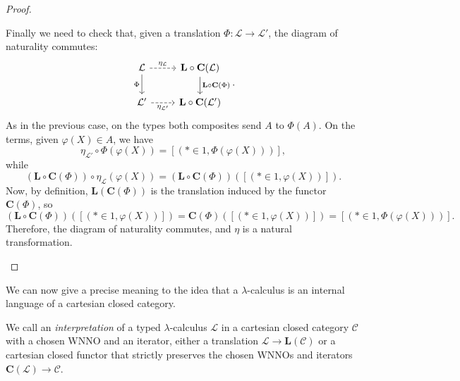 \begin{proof}
\begin{itemize}
        Finally we need to check that, given a translation $\Phi : \mathcal L \to \mathcal L'$, the diagram of naturality commutes:
        \[\begin{tikzcd}
            {\mathcal L} & {\mathbf L \circ \mathbf C(\mathcal L)} \\
            {\mathcal L'} & {\mathbf L \circ \mathbf C(\mathcal L')}
            \arrow["{\eta_{\mathcal L}}", dashed, from=1-1, to=1-2]
            \arrow["\Phi"', from=1-1, to=2-1]
            \arrow["{\mathbf L \circ \mathbf C(\Phi)}", from=1-2, to=2-2]
            \arrow["{\eta_{\mathcal L'}}"', dashed, from=2-1, to=2-2]
        \end{tikzcd}.\]
        As in the previous case, on the types both composites send $A$ to $\Phi(A)$. On the terms, given $\varphi(X) \in A$, we have
        \[ \eta_{\mathcal L'} \circ \Phi(\varphi(X)) = [(* \in 1, \Phi(\varphi(X)))], \]
        while
        \[ (\mathbf L \circ \mathbf C(\Phi)) \circ \eta_\mathcal L(\varphi(X)) = (\mathbf L \circ \mathbf C(\Phi))([(* \in 1, \varphi(X))]). \]
        Now, by definition, $\mathbf L(\mathbf C(\Phi))$ is the translation induced by the functor $\mathbf C(\Phi)$, so
        \[ (\mathbf L \circ \mathbf C(\Phi))([(* \in 1, \varphi(X))]) = \mathbf C(\Phi)([(* \in 1,\varphi(X))]) = [(* \in 1,\Phi(\varphi(X)))]. \]
        Therefore, the diagram of naturality commutes, and $\eta$ is a natural transformation.
    \end{itemize}
\end{proof}

We can now give a precise meaning to the idea that a $\lambda$-calculus is an internal language of a cartesian closed category.

\begin{definition}
    We call an \emph{interpretation} of a typed $\lambda$-calculus $\mathcal L$ in a cartesian closed category $\mathcal C$ with a chosen WNNO and an iterator, either a translation $\mathcal L \to \mathbf L(\mathcal C)$
    or a cartesian closed functor that strictly preserves the chosen WNNOs and iterators $\mathbf C(\mathcal L) \to \mathcal C$.
\end{definition}

